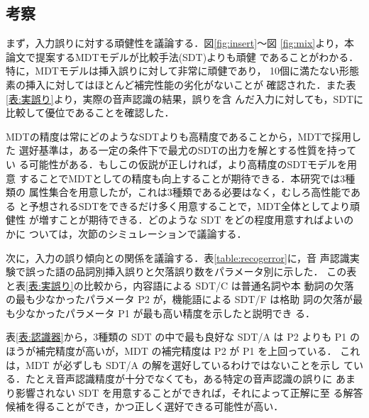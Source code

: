 \subsection{考察}
\label{節:考察}

まず，入力誤りに対する頑健性を議論する．図\ref{fig:insert}〜図
\ref{fig:mix}より，本論文で提案するMDTモデルが比較手法(SDT)よりも頑健
であることがわかる．特に，MDTモデルは挿入誤りに対して非常に頑健であり，
10個に満たない形態素の挿入に対してはほとんど補完性能の劣化がないことが
確認された．また表\ref{表:実誤り}より，実際の音声認識の結果，誤りを含
んだ入力に対しても，SDTに比較して優位であることを確認した．

MDTの精度は常にどのようなSDTよりも高精度であることから，MDTで採用した
選好基準は，ある一定の条件下で最尤のSDTの出力を解とする性質を持ってい
る可能性がある．もしこの仮説が正しければ，より高精度のSDTモデルを用意
することでMDTとしての精度も向上することが期待できる．本研究では3種類の
属性集合を用意したが，これは3種類である必要はなく，むしろ高性能である
と予想されるSDTをできるだけ多く用意することで，MDT全体としてより頑健性
が増すことが期待できる．どのような SDT をどの程度用意すればよいのかに
ついては，次節のシミュレーションで議論する．


次に，入力の誤り傾向との関係を議論する．表\ref{table:recogerror}に，音
声認識実験で誤った語の品詞別挿入誤りと欠落誤り数をパラメータ別に示した．
この表と表\ref{表:実誤り}の比較から，内容語による SDT/C は普通名詞や本
動詞の欠落の最も少なかったパラメータ P2 が，機能語による SDT/F は格助
詞の欠落が最も少なかったパラメータ P1 が最も高い精度を示したと説明でき
る．

表\ref{表:認識器}から，3種類の SDT の中で最も良好な SDT/A は P2 よりも 
P1 のほうが補完精度が高いが，MDT の補完精度は P2 が P1 を上回っている．
これは，MDT が必ずしも SDT/A の解を選好しているわけではないことを示し
ている．たとえ音声認識精度が十分でなくても，ある特定の音声認識の誤りに
あまり影響されない SDT を用意することができれば，それによって正解に至
る解答候補を得ることができ，かつ正しく選好できる可能性が高い．


